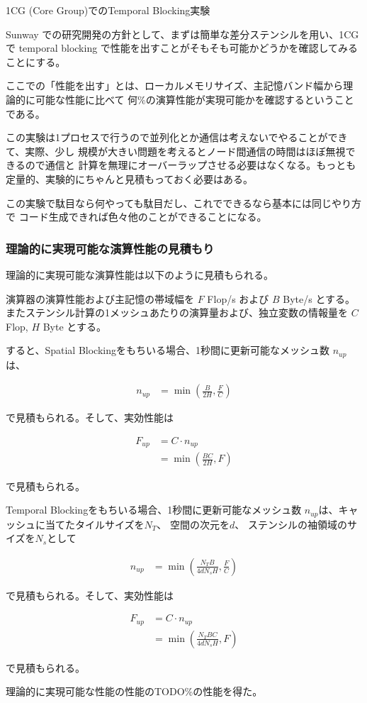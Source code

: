 1CG (Core Group)でのTemporal Blocking実験

Sunway での研究開発の方針として、まずは簡単な差分ステンシルを用い、1CGで
temporal blocking で性能を出すことがそもそも可能かどうかを確認してみることにする。

ここでの「性能を出す」とは、ローカルメモリサイズ、主記憶バンド幅から理論的に可能な性能に比べて
何\%の演算性能が実現可能かを確認するということである。


この実験は1プロセスで行うので並列化とか通信は考えないでやることができて、実際、少し
規模が大きい問題を考えるとノード間通信の時間はほぼ無視できるので通信と
計算を無理にオーバーラップさせる必要はなくなる。もっとも
定量的、実験的にちゃんと見積もっておく必要はある。



この実験で駄目なら何やっても駄目だし、これでできるなら基本には同じやり方で
コード生成できれば色々他のことができることになる。


\subsubsection{理論的に実現可能な演算性能の見積もり}

理論的に実現可能な演算性能は以下のように見積もられる。

演算器の演算性能および主記憶の帯域幅を
$F$ Flop/s および
$B$ Byte/s とする。またステンシル計算の1メッシュあたりの演算量および、独立変数の情報量を
$C$ Flop, $H$ Byte とする。

すると、Spatial Blockingをもちいる場合、1秒間に更新可能なメッシュ数
$n_{up}$は、

\begin{align}
n_{up} &= \min \left( \frac{B}{2H}, \frac{F}{C} \right)
\end{align}

で見積もられる。そして、実効性能は

\begin{align}
  F_{up} &= C \cdot n_{up} \\
  &= \min \left( \frac{BC}{2H}, F \right)
\end{align}

で見積もられる。


Temporal Blockingをもちいる場合、1秒間に更新可能なメッシュ数
$n_{up}$は、キャッシュに当てたタイルサイズを$N_T$、
空間の次元を$d$、
ステンシルの袖領域のサイズを$N_s$として

\begin{align}
n_{up} &= \min \left( \frac{N_T B}{4dN_s H}, \frac{F}{C} \right)
\end{align}

で見積もられる。そして、実効性能は

\begin{align}
  F_{up} &= C \cdot n_{up} \\
  &= \min \left( \frac{N_T B C}{4 d N_s H}, F \right)
\end{align}

で見積もられる。





理論的に実現可能な性能の性能のTODO\%の性能を得た。
